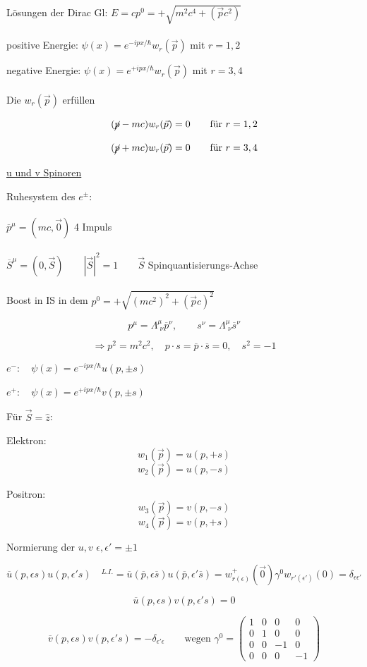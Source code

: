 Lösungen der Dirac Gl: \(E=cp^0 = +\sqrt{m^2c^4+(\vec pc^2)}\)\\
\\
positive Energie: \(\psi(x) = e^{-ipx/\hbar}w_r(\vec p)\) mit \(r=1,2\)

negative Energie: \(\psi(x) = e^{+ipx/\hbar}w_r(\vec p)\) mit \(r=3,4\)\\
\\
Die \(w_r(\vec p)\) erfüllen

\[(\cancel p - mc)w_r(\vec p) = 0 \qquad\text{für } r=1,2\]

\[(\cancel p + mc)w_r(\vec p) = 0 \qquad\text{für } r=3,4\]


\underline{u und v Spinoren}


Ruhesystem des \(e^{\pm}\):\\
\\
 \(\overline p^\mu = (mc,\vec 0)\) 4 Impuls \\
\\
\(\overline S^\mu = (0,\vec S)\qquad |\vec S|^2=1 \qquad \vec S\) Spinquantisierungs-Achse\\
\\
Boost in IS in dem \(p^0 = +\sqrt{(mc^2)^2+(\vec p c)^2} \)

\[p^\mu = \Lambda^\mu_{\,\,\nu}\overline p^\nu, \qquad s^\nu =\Lambda^\mu_{\,\,\nu}\overline s^\nu \]

\[\Rightarrow p^2=m^2c^2, \quad p\cdot s = \overline p\cdot \overline s = 0,\quad s^2 = -1\]

\(e^-:\quad \psi(x) = e^{-ipx/\hbar}u(p,\pm s)\)

\(e^+:\quad \psi(x) = e^{+ipx/\hbar}v(p,\pm s)\)


Für \(\vec S = \hat z\):

Elektron:
\[w_1(\vec p) = u(p,+s)\]
\[w_2(\vec p) = u(p,-s)\]

Positron:
\[w_3(\vec p) = v(p,-s)\]
\[w_4(\vec p) = v(p,+s)\]



Normierung der \(u,v\) \(\epsilon,\epsilon' = \pm 1\)

\[\overline u(p,\epsilon s) u(p,\epsilon' s)\quad ^{L.I.}= \overline u(\overline p,\epsilon\overline s)  u(\overline p,\epsilon'\overline s) = w^+_{r(\epsilon)}(\vec 0)\gamma^0w_{r'(\epsilon')}(0) = \delta_{\epsilon\epsilon'}\]

\[\overline u(p,\epsilon s) v(p,\epsilon' s) = 0\]

\[\overline v(p,\epsilon s) v(p,\epsilon' s) =-\delta_{\epsilon'\epsilon}\qquad \text{wegen } \gamma^0 = \begin{pmatrix}1&0&0&0\\ 0&1&0&0\\0&0&-1&0\\0&0&0&-1\end{pmatrix} \]

